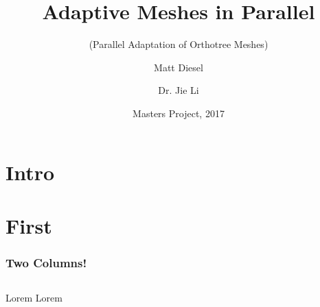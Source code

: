 \documentclass{beamer}
\title{Adaptive Meshes in Parallel}
\subtitle{(Parallel Adaptation of Orthotree Meshes)}
\author{Matt Diesel \and Dr. Jie Li}
\institute{Cambridge University Engineering Department}
\date{Masters Project, 2017}
\begin{document}
\section{Intro}
\begin{frame}
	\titlepage
\end{frame}

\section{First}
\begin{frame}
	\frametitle{Two Columns!}
	
	\begin{columns}
			Lorem
			Lorem
	\end{columns}
\end{frame}
\end{document}
